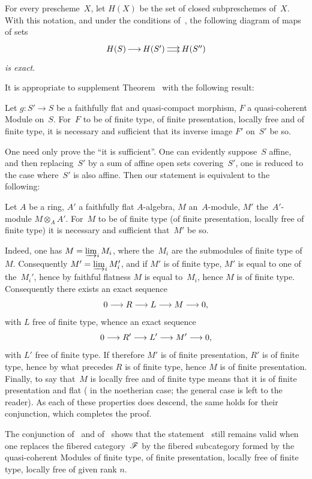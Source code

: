 \begin{corollary}
\label{VIII.1.9}
For every prescheme~$X$, let $H(X)$ be the set of
closed subpreschemes of~$X$. With this notation, and
under the conditions of~, the following diagram of maps
of sets
$$
\xymatrix@C=.5cm{H(S)\ar[r] & H(S')\ar@<2pt>[r]\ar@<-2pt>[r] & H(S'')}
$$
\emph{is exact}.
\end{corollary}

It is appropriate to supplement Theorem~ with the
following result:

\begin{proposition}
\label{VIII.1.10}
Let $g\colon S'\to S$ be a faithfully flat and
quasi-compact morphism, $F$ a quasi-coherent Module on~$S$. For~$F$
to be of finite type, \resp of finite presentation, \resp locally
free and of finite type, it is necessary and sufficient that its inverse image $F'$
on~$S'$ be so.
\end{proposition}

One need only prove the ``it is sufficient''. One can evidently
suppose~$S$ affine,
and then replacing~$S'$ by
a
sum of affine open sets covering~$S'$, one is reduced to the case
where~$S'$ is also affine. Then our statement
is equivalent to the following:

\begin{corollary}
\label{VIII.1.11}
Let $A$ be a ring, $A'$ a faithfully flat $A$-algebra,
$M$ an~$A$-module, $M'$ the~$A'$-module $M\otimes_{A}A'$. For~$M$
to be of finite type (\resp of finite presentation, \resp locally
free of finite type) it is necessary and sufficient that~$M'$ be so.
\end{corollary}

Indeed, one has $M=\varinjlim_i M_{i}$, where the~$M_{i}$
are the submodules of finite type of~$M$. Consequently
$M'=\varinjlim_i M_{i}'$, and if $M'$ is of finite type, $M'$
is equal to one of the~$M_{i}'$, hence by faithful flatness
$M$ is equal to~$M_{i}$, hence $M$ is of finite type. Consequently
there exists an exact sequence
$$
0\to R\to L\to M\to 0\quoi,
$$
with $L$ free of finite type, whence an exact sequence
$$
0\to R'\to L'\to M'\to 0\quoi,
$$
with $L'$ free of finite type. If therefore $M'$ is of finite
presentation, $R'$ is of finite type, hence by what precedes
$R$ is of finite type, hence $M$ is of finite presentation. Finally,
to say that~$M$ is locally free and of finite type means that it is
of finite presentation and flat (\cf {} in the
noetherian case; the general case is left to the
reader). As each of these properties does descend, the
same holds for their conjunction, which completes the
proof.

\begin{remark}
\label{VIII.1.12}
The conjunction of~ and of~ shows that
the statement~ still remains valid when one
replaces the fibered category~$\cal{F}$ by the
fibered subcategory formed by the quasi-coherent Modules
of finite type, \resp of finite presentation,
\resp locally free of finite type, \resp locally free of
given rank $n$.
\end{remark}
